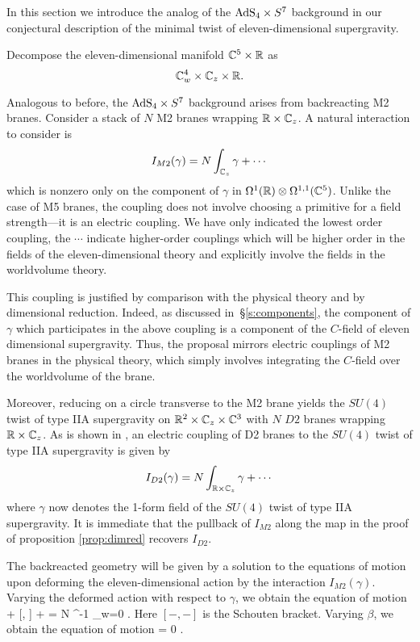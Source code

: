 In this section we introduce the analog of the ${\rm AdS}_4 \times S^7$ background in our conjectural description of the minimal twist of eleven-dimensional supergravity. 

\parsec[]

Decompose the eleven-dimensional manifold $\mathbb C^5 \times \mathbb R$ as
\[
 \mathbb C^4_w\times \mathbb C_z \times \mathbb R .
\]

Analogous to before, the ${\rm AdS}_4 \times S^7$ background arises from backreacting M2 branes. Consider a stack of $N$ M2 branes wrapping $\mathbb{R}\times \mathbb{C}_z$. A natural interaction to consider is 
\[
I_{M2}(\gamma) = N\int_{\mathbb{C}_z} \gamma + \cdots
\] 
which is nonzero only on the component of $\gamma$ in $\Omega^1(\mathbb{R})\otimes \Omega^{1,1}(\mathbb{C}^5)$. Unlike the case of M5 branes, the coupling does not involve choosing a primitive for a field strength---it is an electric coupling.
We have only indicated the lowest order coupling, the $\cdots$ indicate higher-order couplings which will be higher order in the fields of the eleven-dimensional theory and explicitly involve the fields in the worldvolume theory. 

This coupling is justified by comparison with the physical theory and by dimensional reduction. 
Indeed, as discussed in~\S\ref{s:components}, the component of $\gamma$ which participates in the above coupling is a component of the $C$-field of eleven dimensional supergravity. Thus, the proposal mirrors electric couplings of M2 branes in the physical theory, which simply involves integrating the $C$-field over the worldvolume of the brane. 

Moreover, reducing on a circle transverse to the M2 brane yields the $SU(4)$ twist of type IIA supergravity on $\mathbb{R}^2\times \mathbb{C}_z\times \mathbb{C}^3$ with $N$ $D2$ branes wrapping $\mathbb{R}\times \mathbb{C}_z$. As is shown in \cite{CLsugra}, an electric coupling of D2 branes to the $SU(4)$ twist of type IIA supergravity is given by 
\[
I_{D2}(\gamma) = N \int_{\mathbb{R}\times\mathbb{C}_z} \gamma + \cdots
\] 
where $\gamma$ now denotes the 1-form field of the $SU(4)$ twist of type IIA supergravity. It is immediate that the pullback of $I_{M2}$ along the map in the proof of proposition \ref{prop:dimred} recovers $I_{D2}$. 


The backreacted geometry will be given by a solution to the equations of motion upon deforming the eleven-dimensional action by the interaction $I_{M2}(\gamma)$. 
Varying the deformed action with respect to $\gamma$,
we obtain the equation of motion
\beqn\label{eqn:ads4eom1}
\dbar \mu +  [\mu, \mu] + \partial\gamma\partial\gamma = N \Omega^{-1} \delta_{w=0} .
\eeqn
Here $[-,-]$ is the Schouten bracket. 
Varying $\beta$, we obtain the equation of motion
\beqn\label{eqn:adseom2}
\div \mu = 0 .
\eeqn

